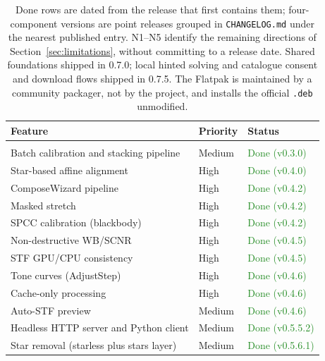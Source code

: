 \documentclass[11pt,a4paper]{article}
\newcommand{\code}[1]{\texttt{\small #1}}
\begin{document}
    \begingroup
    \small
    \setlength{\LTcapwidth}{\textwidth}
    \begin{longtable}{>{\raggedright\arraybackslash}p{8.4cm}ll}
            \toprule
            \textbf{Feature} & \textbf{Priority} & \textbf{Status} \\
            \midrule
            \endhead
            \bottomrule
            \caption{Done rows are dated from the release that first contains them; four-component versions are point releases grouped in \code{CHANGELOG.md} under the nearest published entry. N1--N5 identify the remaining directions of Section~\ref{sec:limitations}, without committing to a release date. Shared foundations shipped in 0.7.0; local hinted solving and catalogue consent and download flows shipped in 0.7.5. The Flatpak is maintained by a community packager, not by the project, and installs the official \code{.deb} unmodified.}
            \endlastfoot
            \midrule
            \multicolumn{3}{r}{\footnotesize\textit{continued on the next page}} \\
            \endfoot
            Batch calibration and stacking pipeline & Medium & \textcolor{ForestGreen}{Done (v0.3.0)} \\
            Star-based affine alignment & High & \textcolor{ForestGreen}{Done (v0.4.0)} \\
            ComposeWizard pipeline & High & \textcolor{ForestGreen}{Done (v0.4.2)} \\
            Masked stretch & High & \textcolor{ForestGreen}{Done (v0.4.2)} \\
            SPCC calibration (blackbody) & High & \textcolor{ForestGreen}{Done (v0.4.2)} \\
            Non-destructive WB/SCNR & High & \textcolor{ForestGreen}{Done (v0.4.5)} \\
            STF GPU/CPU consistency & High & \textcolor{ForestGreen}{Done (v0.4.5)} \\
            Tone curves (AdjustStep) & High & \textcolor{ForestGreen}{Done (v0.4.6)} \\
            Cache-only processing & High & \textcolor{ForestGreen}{Done (v0.4.6)} \\
            Auto-STF preview & Medium & \textcolor{ForestGreen}{Done (v0.4.6)} \\
            Headless HTTP server and Python client & Medium & \textcolor{ForestGreen}{Done (v0.5.5.2)} \\
            Star removal (starless plus stars layer) & Medium & \textcolor{ForestGreen}{Done (v0.5.6.1)} \\

\end{longtable}
\end{document}

